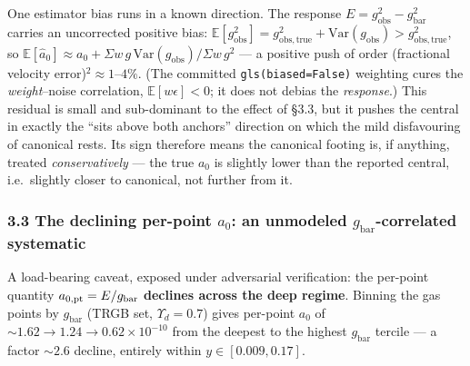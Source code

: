 \documentclass[
]{article}
\begin{document}
One estimator bias runs in a known direction. The response
\(E=g_\mathrm{obs}^2-g_\mathrm{bar}^2\) carries an uncorrected positive bias:
\(\mathbb E[g_\mathrm{obs}^2]=g_\mathrm{obs,true}^2+\mathrm{Var}(g_\mathrm{obs})>g_\mathrm{obs,true}^2\),
so
\(\mathbb E[\hat a_0]\approx a_0+\Sigma w\,g\,\mathrm{Var}(g_\mathrm{obs})/\Sigma w\,g^2\)
--- a positive push of order (fractional velocity
error)\(^2\approx1\)--\(4\%\). (The committed \texttt{gls(biased=False)}
weighting cures the \emph{weight}--noise correlation,
\(\mathbb E[w\epsilon]<0\); it does not debias the \emph{response}.)
This residual is small and sub-dominant to the effect of §3.3, but it
pushes the central in exactly the ``sits above both anchors'' direction
on which the mild disfavouring of canonical rests. Its sign therefore
means the canonical footing is, if anything, treated
\emph{conservatively} --- the true \(a_0\) is slightly lower than the
reported central, i.e.~slightly closer to canonical, not further from
it.

\subsubsection{\texorpdfstring{3.3 The declining per-point \(a_0\): an
unmodeled \(g_\mathrm{bar}\)-correlated
systematic}{3.3 The declining per-point a\_0: an unmodeled g\_\{\textbackslash rm bar\}-correlated systematic}}\label{the-declining-per-point-a_0-an-unmodeled-g_rm-bar-correlated-systematic}

A load-bearing caveat, exposed under adversarial verification: the
per-point quantity \(a_{0,\rm pt}=E/g_\mathrm{bar}\) \textbf{declines
across the deep regime}. Binning the gas points by \(g_\mathrm{bar}\) (TRGB
set, \(\Upsilon_d=0.7\)) gives per-point \(a_0\) of
\(\sim1.62\to1.24\to0.62\times10^{-10}\) from the deepest to the highest
\(g_\mathrm{bar}\) tercile --- a factor \(\sim2.6\) decline, entirely
within \(y\in[0.009,0.17]\).
\end{document}
